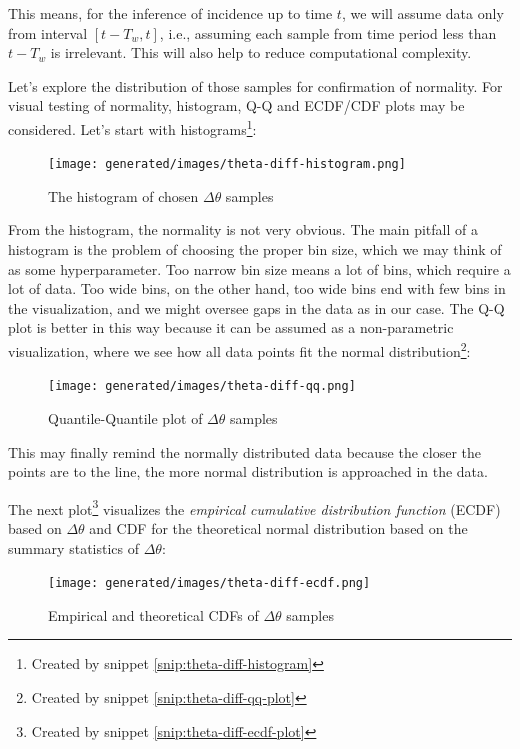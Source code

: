 \documentclass[
  digital, %
  oneside, %
  lof,     %
  lot,     %
]{fithesis4}
\begin{document}
This means, for the inference of incidence up to time $t$, we will assume data only from interval $[t - T_w, t]$, i.e., assuming each sample from time period less than $t - T_w$ is irrelevant.
This will also help to reduce computational complexity.

Let's explore the distribution of those samples for confirmation of normality. 
For visual testing of normality, histogram, Q-Q and ECDF/CDF plots may be considered.
Let's start with histograms\footnote{Created by snippet \ref{snip:theta-diff-histogram}}:

\begin{figure}[H]
  \begin{center}
    \texttt{[image: generated/images/theta-diff-histogram.png]}
  \end{center}
  \caption{The histogram of chosen $\Delta \theta$ samples}
  \label{fig:theta-diff-histogram}
\end{figure}

From the histogram, the normality is not very obvious.
The main pitfall of a histogram is the problem of choosing the proper bin size, which we may think of as some hyperparameter.
Too narrow bin size means a lot of bins, which require a lot of data.
Too wide bins, on the other hand, too wide bins end with few bins in the visualization, and we might oversee gaps in the data as in our case.
The Q-Q plot is better in this way because it can be assumed as a non-parametric visualization, where we see how all data points fit the normal distribution\footnote{Created by snippet \ref{snip:theta-diff-qq-plot}}:

\begin{figure}[H]
  \begin{center}
    \texttt{[image: generated/images/theta-diff-qq.png]}
  \end{center}
  \caption{Quantile-Quantile plot of $\Delta \theta$ samples}
  \label{fig:theta-diff-qq}
\end{figure}


This may finally remind the normally distributed data because the closer the points are to the line, the more normal distribution is approached in the data.

The next plot\footnote{Created by snippet \ref{snip:theta-diff-ecdf-plot}} visualizes the \textit{empirical cumulative distribution function} (ECDF) based on $\Delta \theta$ and CDF for the theoretical normal distribution based on the summary statistics of $\Delta \theta$:

\begin{figure}[H]
  \begin{center}
    \texttt{[image: generated/images/theta-diff-ecdf.png]}
  \end{center}
  \caption{Empirical and theoretical CDFs of $\Delta \theta$ samples}
  \label{fig:theta-diff-ecdf}
\end{figure}
\end{document}

